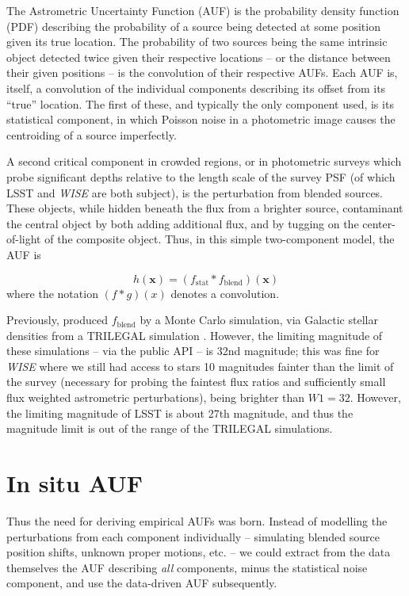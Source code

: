 \documentclass[fleqn,usenatbib]{mnras}
\begin{document}
The Astrometric Uncertainty Function (AUF) is the probability density function (PDF) describing the probability of a source being detected at some position given its true location. The probability of two sources being the same intrinsic object detected twice given their respective locations -- or the distance between their given positions -- is the convolution of their respective AUFs. Each AUF is, itself, a convolution of the individual components describing its offset from its ``true'' location. The first of these, and typically the only component used, is its statistical component, in which Poisson noise in a photometric image causes the centroiding of a source imperfectly.

A second critical component in crowded regions, or in photometric surveys which probe significant depths relative to the length scale of the survey PSF (of which LSST and \textit{WISE} are both subject), is the perturbation from blended sources. These objects, while hidden beneath the flux from a brighter source, contaminant the central object by both adding additional flux, and by tugging on the center-of-light of the composite object. Thus, in this simple two-component model, the AUF is

\begin{equation}
h(\textbf{x}) = (f_\mathrm{stat} * f_\mathrm{blend})(\textbf{x})
\end{equation}
where the notation $(f * g)(x)$ denotes a convolution.

Previously, \citet{2018MNRAS.481.2148W} produced $f_\mathrm{blend}$ by a Monte Carlo simulation, via Galactic stellar densities from a TRILEGAL simulation \citep{Girardi2005}. However, the limiting magnitude of these simulations -- via the public API -- is 32nd magnitude; this was fine for \textit{WISE} where we still had access to stars 10 magnitudes fainter than the limit of the survey (necessary for probing the faintest flux ratios and sufficiently small flux weighted astrometric perturbations), being brighter than $W1=32$. However, the limiting magnitude of LSST is about 27th magnitude, and thus the magnitude limit is out of the range of the TRILEGAL simulations.

\section{In situ AUF}
Thus the need for deriving empirical AUFs was born. Instead of modelling the perturbations from each component individually -- simulating blended source position shifts, unknown proper motions, etc. -- we could extract from the data themselves the AUF describing \textit{all} components, minus the statistical noise component, and use the data-driven AUF subsequently.
\end{document}
